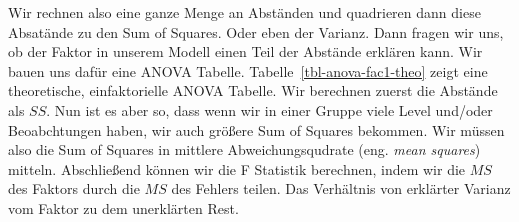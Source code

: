 \documentclass[
  letterpaper,
  DIV=11,
  oneside]{scrreport}
\begin{document}
Wir rechnen also eine ganze Menge an Abständen und quadrieren dann diese
Absatände zu den Sum of Squares. Oder eben der Varianz. Dann fragen wir
uns, ob der Faktor in unserem Modell einen Teil der Abstände erklären
kann. Wir bauen uns dafür eine ANOVA Tabelle.
Tabelle~\ref{tbl-anova-fac1-theo} zeigt eine theoretische,
einfaktorielle ANOVA Tabelle. Wir berechnen zuerst die Abstände als
\(SS\). Nun ist es aber so, dass wenn wir in einer Gruppe viele Level
und/oder Beoabchtungen haben, wir auch größere Sum of Squares bekommen.
Wir müssen also die Sum of Squares in mittlere Abweichungsqudrate (eng.
\emph{mean squares}) mitteln. Abschließend können wir die F Statistik
berechnen, indem wir die \(MS\) des Faktors durch die \(MS\) des Fehlers
teilen. Das Verhältnis von erklärter Varianz vom Faktor zu dem
unerklärten Rest.
\end{document}
